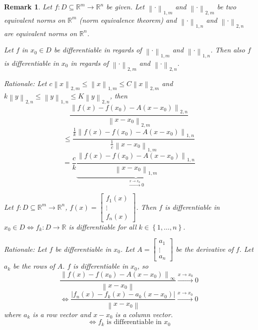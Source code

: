 \documentclass{article}
\newtheorem{remark}{Remark}  \numberwithin{remark}{section}
\newcommand{\set}[1]{\left\{#1\right\}}
\newcommand{\norm}[1]{\left\|#1\right\|}
\newcommand{\card}[1]{\left|#1\right|}
\begin{document}
\begin{remark}
  Let $f: D \subseteq \mathbb R^m \to \mathbb R^n$ be given.
  Let $\norm{\cdot}_{1,m}$ and $\norm{\cdot}_{2,m}$ be two equivalent norms on $\mathbb R^m$ (norm equivalence theorem)
  and $\norm{\cdot}_{1,n}$ and $\norm{\cdot}_{2,n}$ are equivalent norms on $\mathbb R^n$.

  Let $f$ in $x_0 \in D$ be differentiable in regards of $\norm{\cdot}_{1,m}$ and $\norm{\cdot}_{1,n}$.
  Then also $f$ is differentiable in $x_0$ in regards of $\norm{\cdot}_{2,m}$ and $\norm{\cdot}_{2,n}$.

  \emph{Rationale:} Let $c \norm{x}_{2,m} \leq \norm{x}_{1,m} \leq C \norm{x}_{2,m}$ and
  $k \norm{y}_{2,n} \leq \norm{y}_{1,n} \leq K \norm{y}_{2,n}$, then
  \[ \frac{\norm{f(x) - f(x_0) - A(x - x_0)}_{2,n}}{\norm{x - x_0}_{2,m}} \]
  \[ \leq \frac{\frac1k \norm{f(x) - f(x_0) - A(x - x_0)}_{1,n}}{\frac1c \norm{x - x_0}_{1,m}} \]
  \[ = \frac ck \underbrace{\frac{\norm{f(x) - f(x_0) - A (x - x_0)}_{1,n}}{\norm{x - x_0}_{1,m}}}_{\xrightarrow{x \to x_0} 0} \]

  Let $f: D \subseteq \mathbb R^m \to \mathbb R^n$, $f(x) = \begin{bmatrix} f_1(x) \\ \vdots \\ f_n(x) \end{bmatrix}$.
  Then $f$ is differentiable in $x_0 \in D \iff f_k: D \to \mathbb R$ is differentiable for all $k \in \set{1, \dots, n}$.
  
  \emph{Rationale:} Let $f$ be differentiable in $x_0$. Let $A = \begin{bmatrix} a_1 \\ \vdots \\ a_n \end{bmatrix}$ be the derivative of $f$.
  Let $a_k$ be the rows of $A$. $f$ is differentiable in $x_0$, so
  \[ \frac{\norm{f(x) - f(x_0) - A(x - x_0)}_{\infty}}{\norm{x - x_0}} \xrightarrow{x \to x_0} 0 \]
  \[ \iff \frac{\card{f_n(x) - f_k(x) - a_k(x - x_0)}}{\norm{x - x_0}} \xrightarrow{x \to x_0} 0 \] %
  where $a_k$ is a row vector and $x-x_0$ is a column vector.
  \[ \iff f_k \text{ is differentiable in } x_0 \]
\end{remark}
\end{document}
